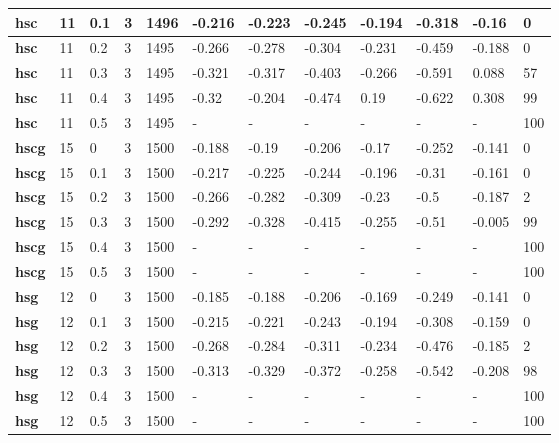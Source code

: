 \begin{longtable}[h]{|p{0.8cm}|p{1.5cm}|p{1cm}|p{1cm}|p{1cm}|p{1cm}|p{1cm}|p{1cm}|p{1cm}|p{1cm}|p{1cm}|p{1.5cm}|}
    \\ \hline
  \textbf{hsc } &  11         & 0.1 & 3 & 1496 & -0.216 & -0.223 & -0.245 & -0.194 & -0.318 &  -0.16 &   0
    \\ \hline
  \textbf{hsc } &  11         & 0.2 & 3 & 1495 & -0.266 & -0.278 & -0.304 & -0.231 & -0.459 & -0.188 &   0
    \\ \hline
  \textbf{hsc } &  11         & 0.3 & 3 & 1495 & -0.321 & -0.317 & -0.403 & -0.266 & -0.591 &  0.088 &  57
    \\ \hline
  \textbf{hsc } &  11         & 0.4 & 3 & 1495 &  -0.32 & -0.204 & -0.474 &   0.19 & -0.622 &  0.308 &  99
    \\ \hline
  \textbf{hsc } &  11         & 0.5 & 3 & 1495 & - & - & - & - & - & - & 100
    \\ \hline
  \textbf{hscg} &  15         &   0 & 3 & 1500 & -0.188 &  -0.19 & -0.206 &  -0.17 & -0.252 & -0.141 &   0
    \\ \hline
  \textbf{hscg} &  15         & 0.1 & 3 & 1500 & -0.217 & -0.225 & -0.244 & -0.196 &  -0.31 & -0.161 &   0
    \\ \hline
  \textbf{hscg} &  15         & 0.2 & 3 & 1500 & -0.266 & -0.282 & -0.309 &  -0.23 &   -0.5 & -0.187 &   2
    \\ \hline
  \textbf{hscg} &  15         & 0.3 & 3 & 1500 & -0.292 & -0.328 & -0.415 & -0.255 &  -0.51 & -0.005 &  99
    \\ \hline
  \textbf{hscg} &  15         & 0.4 & 3 & 1500 & - & - & - & - & - & - & 100
    \\ \hline
  \textbf{hscg} &  15         & 0.5 & 3 & 1500 & - & - & - & - & - & - & 100
    \\ \hline
  \textbf{hsg } &  12         &   0 & 3 & 1500 & -0.185 & -0.188 & -0.206 & -0.169 & -0.249 & -0.141 &   0
    \\ \hline
  \textbf{hsg } &  12         & 0.1 & 3 & 1500 & -0.215 & -0.221 & -0.243 & -0.194 & -0.308 & -0.159 &   0
    \\ \hline
  \textbf{hsg } &  12         & 0.2 & 3 & 1500 & -0.268 & -0.284 & -0.311 & -0.234 & -0.476 & -0.185 &   2
    \\ \hline
  \textbf{hsg } &  12         & 0.3 & 3 & 1500 & -0.313 & -0.329 & -0.372 & -0.258 & -0.542 & -0.208 &  98
    \\ \hline
  \textbf{hsg } &  12         & 0.4 & 3 & 1500 & - & - & - & - & - & - & 100
    \\ \hline
  \textbf{hsg } &  12         & 0.5 & 3 & 1500 & - & - & - & - & - & - & 100
    \\ \hline
 \end{longtable}
